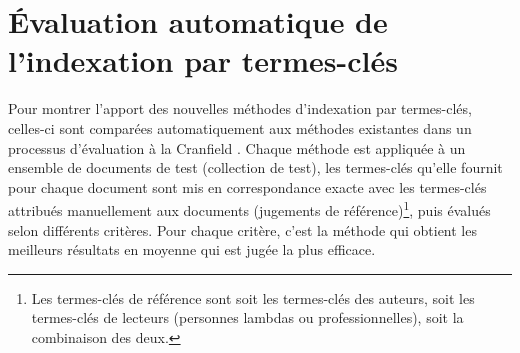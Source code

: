 
  \section{Évaluation automatique de l'indexation par termes-clés}
  \label{sec:main-state_of_the_art-automatic_evaluation_of_keyphrase_annotation}
    Pour montrer l'apport des nouvelles méthodes d'indexation par termes-clés,
    celles-ci sont comparées automatiquement aux méthodes existantes dans un
    processus d'évaluation \og{}à la Cranfield\fg{}
    \citep{voorhees2002philosophy}. Chaque méthode est appliquée à un ensemble
    de documents de test (collection de test), les termes-clés qu'elle fournit
    pour chaque document sont mis en correspondance \og{}exacte\fg{} avec les
    termes-clés attribués manuellement aux documents (jugements de
    référence)\footnote{Les termes-clés de référence sont soit les termes-clés
    des auteurs, soit les termes-clés de lecteurs (personnes lambdas ou
    professionnelles), soit la combinaison des deux.}, puis évalués selon
    différents critères. Pour chaque critère, c'est la méthode qui obtient les
    meilleurs résultats en moyenne qui est jugée la plus efficace.
  
